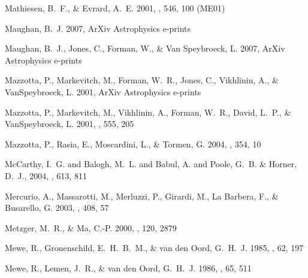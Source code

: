 \documentclass[apj]{emulateapj}
\begin{document}
\begin{thebibliography}{}
{Mathiesen}, B.~F., \& {Evrard}, A.~E. 2001, \apj, 546, 100 (ME01)

{Maughan}, B.~J. 2007, ArXiv Astrophysics e-prints

{Maughan}, B.~J., {Jones}, C., {Forman}, W., \& {Van Speybroeck}, L. 2007,
  ArXiv Astrophysics e-prints

{Mazzotta}, P., {Markevitch}, M., {Forman}, W.~R., {Jones}, C., {Vikhlinin},
  A., \& {VanSpeybroeck}, L. 2001{}, ArXiv Astrophysics e-prints

{Mazzotta}, P., {Markevitch}, M., {Vikhlinin}, A., {Forman}, W.~R., {David},
  L.~P., \& {VanSpeybroeck}, L. 2001{}, \apj, 555, 205

{Mazzotta}, P., {Rasia}, E., {Moscardini}, L., \& {Tormen}, G. 2004, \mnras,
  354, 10

{{McCarthy}, I.~G. and {Balogh}, M.~L. and {Babul}, A. and {Poole},
  G.~B. \& {Horner}, D.~J.}, 2004, \apj, 613, 811

{Mercurio}, A., {Massarotti}, M., {Merluzzi}, P., {Girardi}, M., {La Barbera},
  F., \& {Busarello}, G. 2003, \aap, 408, 57

{Metzger}, M.~R., \& {Ma}, C.-P. 2000, \aj, 120, 2879

{Mewe}, R., {Gronenschild}, E.~H.~B.~M., \& {van den Oord}, G.~H.~J. 1985,
  \aaps, 62, 197

{Mewe}, R., {Lemen}, J.~R., \& {van den Oord}, G.~H.~J. 1986, \aaps, 65, 511


\end{thebibliography}
\end{document}
